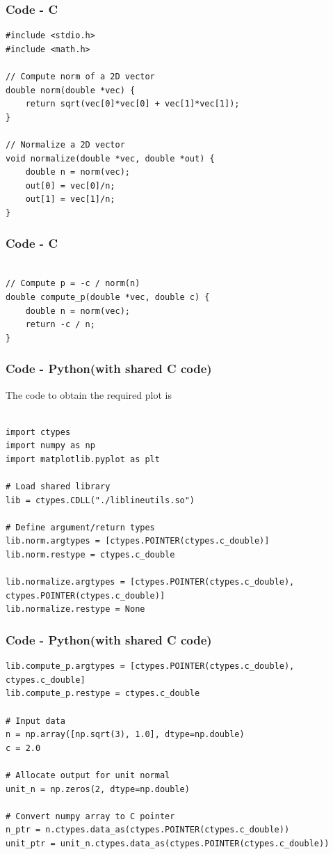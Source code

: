 \documentclass{beamer}
\theoremstyle{remark}
\numberwithin{equation}{section}
\begin{document}
\begin{frame}[fragile]
    \frametitle{Code - C}
    \begin{lstlisting}
#include <stdio.h>
#include <math.h>

// Compute norm of a 2D vector
double norm(double *vec) {
    return sqrt(vec[0]*vec[0] + vec[1]*vec[1]);
}

// Normalize a 2D vector
void normalize(double *vec, double *out) {
    double n = norm(vec);
    out[0] = vec[0]/n;
    out[1] = vec[1]/n;
}

    \end{lstlisting}
    \end{frame}

    \begin{frame}[fragile]
    \frametitle{Code - C}
    \begin{lstlisting}

// Compute p = -c / norm(n)
double compute_p(double *vec, double c) {
    double n = norm(vec);
    return -c / n;
}

\end{lstlisting}
\end{frame}

\begin{frame}[fragile]
    \frametitle{Code - Python(with shared C code)}
    The code to obtain the required plot is
    \begin{lstlisting}

import ctypes
import numpy as np
import matplotlib.pyplot as plt

# Load shared library
lib = ctypes.CDLL("./liblineutils.so")

# Define argument/return types
lib.norm.argtypes = [ctypes.POINTER(ctypes.c_double)]
lib.norm.restype = ctypes.c_double

lib.normalize.argtypes = [ctypes.POINTER(ctypes.c_double), ctypes.POINTER(ctypes.c_double)]
lib.normalize.restype = None

\end{lstlisting}
\end{frame}
\begin{frame}[fragile]
\frametitle{Code - Python(with shared C code)}
\begin{lstlisting}
lib.compute_p.argtypes = [ctypes.POINTER(ctypes.c_double), ctypes.c_double]
lib.compute_p.restype = ctypes.c_double

# Input data
n = np.array([np.sqrt(3), 1.0], dtype=np.double)
c = 2.0

# Allocate output for unit normal
unit_n = np.zeros(2, dtype=np.double)

# Convert numpy array to C pointer
n_ptr = n.ctypes.data_as(ctypes.POINTER(ctypes.c_double))
unit_ptr = unit_n.ctypes.data_as(ctypes.POINTER(ctypes.c_double))

\end{lstlisting}
\end{frame}
\end{document}
